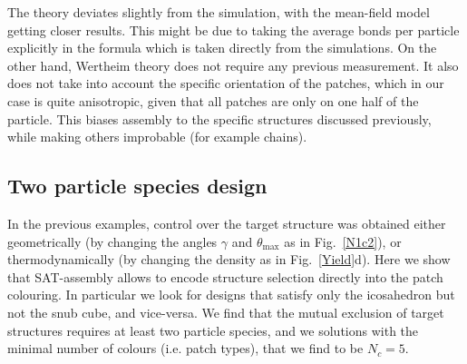 \documentclass[a4paper, amsfonts, amssymb, amsmath, reprint, showkeys, nofootinbib, twoside]{revtex4-1}
\begin{document}






The theory deviates slightly from the simulation, with the mean-field model getting closer results. This might be due to taking the average bonds per particle explicitly in the formula which is taken directly from the simulations. On the other hand, Wertheim theory does not require any previous measurement. It also does not take into account the specific orientation of the patches, which in our case is quite anisotropic, given that all patches are only on one half of the particle. This biases assembly to the specific structures discussed previously, while making others improbable (for example chains).

\subsection{Two particle species design}

In the previous examples, control over the target structure was obtained either geometrically (by changing the angles $\gamma$ and $\theta_\text{max}$ as in Fig.~\ref{N1c2}), or thermodynamically (by changing the density as in Fig.~\ref{Yield}d). Here we show that SAT-assembly allows to encode structure selection directly into the patch colouring. In particular we look for designs that satisfy only the icosahedron but not the snub cube, and vice-versa. We find that the mutual exclusion of target structures requires at least two particle species, and we solutions with the minimal number of colours (i.e. patch types), that we find to be $N_c=5$.
\end{document}
